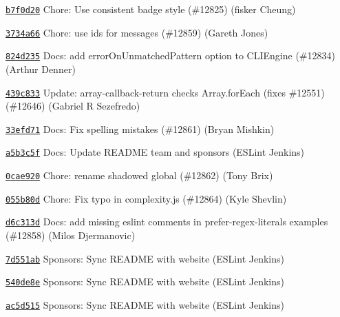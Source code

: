 \begin{DoxyItemize}
\item \href{https://github.com/eslint/eslint/commit/b7f0d200c125b3d233ccafaabdaa61c66dc60e3c}{\texttt{ {\ttfamily b7f0d20}}} Chore\+: Use consistent badge style (\#12825) (fisker Cheung)
\item \href{https://github.com/eslint/eslint/commit/3734a669983de7d5107ba8f39b291c6e3116489f}{\texttt{ {\ttfamily 3734a66}}} Chore\+: use ids for messages (\#12859) (Gareth Jones)
\item \href{https://github.com/eslint/eslint/commit/824d23585c205f2993716585cb6f55dfbe4a33f0}{\texttt{ {\ttfamily 824d235}}} Docs\+: add error\+On\+Unmatched\+Pattern option to CLIEngine (\#12834) (Arthur Denner)
\item \href{https://github.com/eslint/eslint/commit/439c83342c364ba3ce5168d54e165b1fe3e35630}{\texttt{ {\ttfamily 439c833}}} Update\+: array-\/callback-\/return checks Array.\+for\+Each (fixes \#12551) (\#12646) (Gabriel R Sezefredo)
\item \href{https://github.com/eslint/eslint/commit/33efd71d7c3496b4b9cbfe006280527064940826}{\texttt{ {\ttfamily 33efd71}}} Docs\+: Fix spelling mistakes (\#12861) (Bryan Mishkin)
\item \href{https://github.com/eslint/eslint/commit/a5b3c5fa4edc2312534af0d9f0911f68144f8baf}{\texttt{ {\ttfamily a5b3c5f}}} Docs\+: Update README team and sponsors (ESLint Jenkins)
\item \href{https://github.com/eslint/eslint/commit/0cae9203a8077184ad6beb00028fd376cc806f34}{\texttt{ {\ttfamily 0cae920}}} Chore\+: rename shadowed global (\#12862) (Tony Brix)
\item \href{https://github.com/eslint/eslint/commit/055b80dc89bba2a5ab22f7a27deb40135b5cacfa}{\texttt{ {\ttfamily 055b80d}}} Chore\+: Fix typo in complexity.\+js (\#12864) (Kyle Shevlin)
\item \href{https://github.com/eslint/eslint/commit/d6c313de794ea0671d35b5027288cd2ea456c0b5}{\texttt{ {\ttfamily d6c313d}}} Docs\+: add missing eslint comments in prefer-\/regex-\/literals examples (\#12858) (Milos Djermanovic)
\item \href{https://github.com/eslint/eslint/commit/7d551ab8cbf2d3a802b0d0685379aa075fe9d7c0}{\texttt{ {\ttfamily 7d551ab}}} Sponsors\+: Sync README with website (ESLint Jenkins)
\item \href{https://github.com/eslint/eslint/commit/540de8e34d08f4b17b66b06d13927acb7552357a}{\texttt{ {\ttfamily 540de8e}}} Sponsors\+: Sync README with website (ESLint Jenkins)
\item \href{https://github.com/eslint/eslint/commit/ac5d515252c226f030fa646bf7635a12a3b856fe}{\texttt{ {\ttfamily ac5d515}}} Sponsors\+: Sync README with website (ESLint Jenkins)

\end{DoxyItemize}
